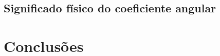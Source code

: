 \documentclass[12pt,a4paper]{article}
\begin{document}
\subsection{Significado físico do coeficiente angular}



\section{Conclusões}
\end{document}
